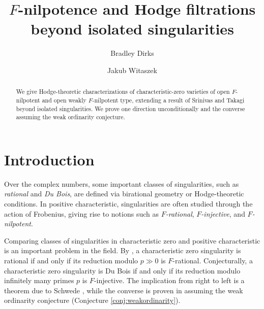 \documentclass[letterpaper,11pt]{amsart}
\theoremstyle{plain}
\theoremstyle{definition}
\theoremstyle{remark}
\begin{document}
\author[B.~Dirks]{Bradley Dirks}


\address{Department of Mathematics, Stony Brook University, Stony Brook, NY 11794-3651, USA}



\author[J.~Witaszek]{Jakub Witaszek}

\address{Northwestern University, Department of Mathematics, Lunt Hall, 2033 Sheridan Road, Evanston IL, 60208, USA}


\begin{abstract} 
We give Hodge-theoretic characterizations of characteristic-zero varieties of open $F$-nilpotent and open weakly $F$-nilpotent type, extending a result of Srinivas and Takagi beyond isolated singularities. We prove one direction unconditionally and the converse assuming the weak ordinarity conjecture.
\end{abstract}








\title{$F$-nilpotence and Hodge filtrations beyond isolated singularities}
\maketitle

\tableofcontents



\section{Introduction}

Over the complex numbers, some important classes of singularities, such as \emph{rational} and \emph{Du Bois}, are defined via birational geometry or Hodge-theoretic conditions. In positive characteristic, singularities are often studied through the action of Frobenius, giving rise to notions such as \emph{$F$-rational}, \emph{$F$-injective}, and \emph{$F$-nilpotent}.

Comparing classes of singularities in characteristic zero and positive characteristic is an important problem in the field. By \cites{Smith97,MS97,Hara98}, a characteristic zero singularity is rational if and only if its reduction modulo $p \gg 0$ is $F$-rational. Conjecturally, a characteristic zero singularity is Du Bois if and only if its reduction modulo  infinitely many primes $p$ is $F$-injective. The implication from right to left is a theorem due to Schwede \cite{Schwede09}, while the converse is proven in \cite{BST} assuming the weak ordinarity conjecture (Conjecture \ref{conj:weakordinarity}). 
\end{document}
